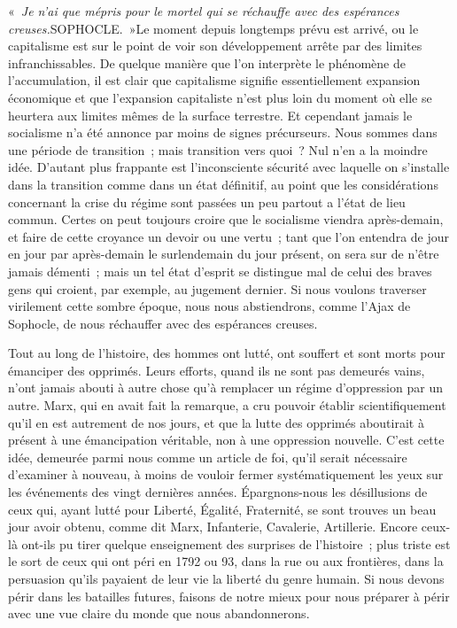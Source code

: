 \documentclass[french,twoside]{book} %
\begin{document}
« \emph{Je n'ai que mépris pour le mortel qui se réchauffe avec des espérances creuses.}{\citbibl SOPHOCLE.} »\noindent Le moment depuis longtemps prévu est arrivé, ou le capitalisme est sur le point de voir son développement arrête par des limites infranchissables. De quelque manière que l'on interprète le phénomène de l'accumulation, il est clair que capitalisme signifie essentiellement expansion économique et que l'expansion capitaliste n'est plus loin du moment où elle se heurtera aux limites mêmes de la surface terrestre. Et cependant jamais le socialisme n'a été annonce par moins de signes précurseurs. Nous sommes dans une période de transition ; mais transition vers quoi ? Nul n'en a la moindre idée. D'autant plus frappante est l'inconsciente sécurité avec laquelle on s'installe dans la transition comme dans un état définitif, au point que les considérations concernant la crise du régime sont passées un peu partout a l'état de lieu commun. Certes on peut toujours croire que le socialisme viendra après-demain, et faire de cette croyance un devoir ou une vertu ; tant que l'on entendra de jour en jour par après-demain le surlendemain du jour présent, on sera sur de n'être jamais démenti ; mais un tel état d'esprit se distingue mal de celui des braves gens qui croient, par exemple, au jugement dernier. Si nous voulons traverser virilement cette sombre époque, nous nous abstiendrons, comme l'Ajax de Sophocle, de nous réchauffer avec des espérances creuses.\par
Tout au long de l'histoire, des hommes ont lutté, ont souffert et sont morts pour émanciper des opprimés. Leurs efforts, quand ils ne sont pas demeurés vains, n'ont jamais abouti à autre chose qu'à remplacer un régime d'oppression par un autre. Marx, qui en avait fait la remarque, a cru pouvoir établir scientifiquement qu'il en est autrement de nos jours, et que la lutte des opprimés aboutirait à présent à une émancipation véritable, non à une oppression nouvelle. C'est cette idée, demeurée parmi nous comme un article de foi, qu'il serait nécessaire d'examiner à nouveau, à moins de vouloir fermer systématiquement les yeux sur les événements des vingt dernières années. Épargnons-nous les désillusions de ceux qui, ayant lutté pour Liberté, Égalité, Fraternité, se sont trouves un beau jour avoir obtenu, comme dit Marx, Infanterie, Cavalerie, Artillerie. Encore ceux-là ont-ils pu tirer quelque enseignement des surprises de l'histoire ; plus triste est le sort de ceux qui ont péri en 1792 ou 93, dans la rue ou aux frontières, dans la persuasion qu'ils payaient de leur vie la liberté du genre humain. Si nous devons périr dans les batailles futures, faisons de notre mieux pour nous préparer à périr avec une vue claire du monde que nous abandonnerons.\par
\end{document}
